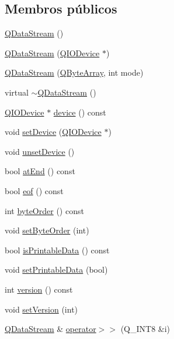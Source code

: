 \subsection*{Membros públicos}
\begin{DoxyCompactItemize}
\item 
\hyperlink{class_q_data_stream_a1d21554b83a077e62f0cbfdae8cfb5fa}{Q\-Data\-Stream} ()
\item 
\hyperlink{class_q_data_stream_aed832d35cad653e3665b62592fa8c635}{Q\-Data\-Stream} (\hyperlink{class_q_i_o_device}{Q\-I\-O\-Device} $\ast$)
\item 
\hyperlink{class_q_data_stream_a846be3264e4bc919979a64d2edd6ed9d}{Q\-Data\-Stream} (\hyperlink{class_q_array}{Q\-Byte\-Array}, int mode)
\item 
virtual \hyperlink{class_q_data_stream_a25e9f82f003df6630979901515738a0b}{$\sim$\-Q\-Data\-Stream} ()
\item 
\hyperlink{class_q_i_o_device}{Q\-I\-O\-Device} $\ast$ \hyperlink{class_q_data_stream_a18846d79bf14c21d749e27eef80bb6a0}{device} () const 
\item 
void \hyperlink{class_q_data_stream_a98230cf62c8603a7d0706e3044030f1b}{set\-Device} (\hyperlink{class_q_i_o_device}{Q\-I\-O\-Device} $\ast$)
\item 
void \hyperlink{class_q_data_stream_aa6b00e03249023ce66f02861f5a6ffae}{unset\-Device} ()
\item 
bool \hyperlink{class_q_data_stream_a11cbf4ba82ee565cb9eef28b972bf145}{at\-End} () const 
\item 
bool \hyperlink{class_q_data_stream_ac4bcdb9a2c4adf5c3d247a711a7142cc}{eof} () const 
\item 
int \hyperlink{class_q_data_stream_a8fe92c42a87f761c0682da5c613d75d6}{byte\-Order} () const 
\item 
void \hyperlink{class_q_data_stream_a6f3acaf002c79fda1af888abbf4dcf8e}{set\-Byte\-Order} (int)
\item 
bool \hyperlink{class_q_data_stream_ad86c3cb0ae4080139e0ee9376d53215f}{is\-Printable\-Data} () const 
\item 
void \hyperlink{class_q_data_stream_a52c59e5985c0651783e12f7e3edcffe7}{set\-Printable\-Data} (bool)
\item 
int \hyperlink{class_q_data_stream_aa5f30d51d4a86222cd00a2e05826a7db}{version} () const 
\item 
void \hyperlink{class_q_data_stream_a652e7f35c2c3a49cf179fadd55ed16c4}{set\-Version} (int)
\item 
\hyperlink{class_q_data_stream}{Q\-Data\-Stream} \& \hyperlink{class_q_data_stream_a918b02e460dd465f3ec86aea51ca59a1}{operator$>$$>$} (Q\-\_\-\-I\-N\-T8 \&i)

\end{DoxyCompactItemize}
